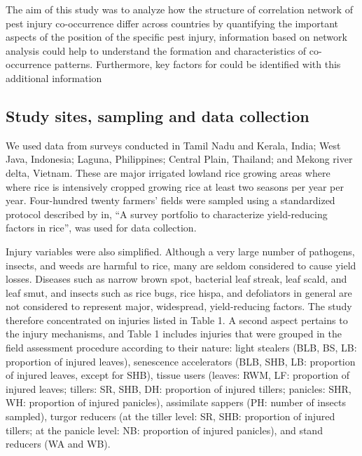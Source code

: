 \documentclass{frontiersSCNS} %
\begin{document}
The aim of this study was to analyze how the structure of correlation network of pest injury co-occurrence differ across countries by quantifying the important aspects of the position of the specific pest injury, information based on network analysis could help to understand the formation and characteristics of co-occurrence patterns. Furthermore, key factors for could be identified with this additional information

                                                                                                                                                                                                                                                                                                 
\begin{methods}

\subsection*{Study sites, sampling and data collection}
We used data from surveys conducted in Tamil Nadu and Kerala, India; West Java, Indonesia; Laguna, Philippines; Central Plain, Thailand; and Mekong river delta, Vietnam. These are major irrigated lowland rice growing areas where where rice is intensively cropped growing rice at least two seasons per year per year. Four-hundred twenty farmers' fields were sampled using a standardized protocol described by \citet{Savarysurvey2009} in, ``A survey portfolio to characterize yield-reducing factors in rice'', was used for data collection.

Injury variables were also simplified. Although a very large number of pathogens, insects, and weeds are harmful to rice, many are seldom considered to cause yield losses. Diseases such as narrow brown spot, bacterial leaf streak, leaf scald, and leaf smut, and insects such as rice bugs, rice hispa, and defoliators in general are not considered to represent major, widespread, yield-reducing factors. The study therefore concentrated on injuries listed in Table 1. A second aspect pertains to the injury mechanisms, and Table 1 includes injuries that were grouped in the field assessment procedure according to their nature: light stealers (BLB, BS, LB: proportion of injured leaves), senescence accelerators (BLB, SHB, LB: proportion of injured leaves, except for SHB), tissue users (leaves: RWM, LF: proportion of injured leaves; tillers: SR, SHB, DH: proportion of injured tillers; panicles: SHR, WH: proportion of injured panicles), assimilate sappers (PH: number of insects sampled), turgor reducers (at the tiller level: SR, SHB: proportion of injured tillers; at the panicle level: NB: proportion of injured panicles), and stand reducers (WA and WB).


\end{methods}
\end{document}
